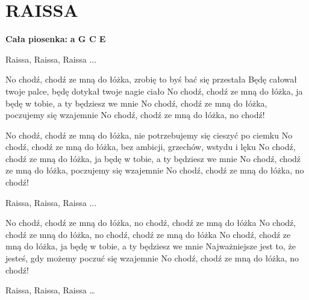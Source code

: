 \documentclass[../../../songbook.tex]{subfiles}
\begin{document}
\TabPositions{8cm} %
\section*{RAISSA}
{}
\vspace{0.5cm}
\textbf{Cała piosenka:} {\color{red}\textbf{a G C E} } \newline

	Raissa, Raissa, Raissa ...		 \newline

No chodź, chodź ze mną do łóżka, zrobię to byś bać się przestała		 \newline
Będę całował twoje palce, będę dotykał twoje nagie ciało			 \newline
No chodź, chodź ze mną do łóżka, ja będę w tobie, a ty będziesz we mnie		 \newline
No chodź, chodź ze mną do łóżka, poczujemy się wzajemnie		 \newline
No chodź, chodź ze mną do łóżka, no chodź!		 \newline

No chodź, chodź ze mną do łóżka, nie potrzebujemy się cieszyć po ciemku		 \newline
No chodź, chodź ze mną do łóżka, bez ambicji, grzechów, wstydu i lęku		 \newline
No chodź, chodź ze mną do łóżka, ja będę w tobie, a ty będziesz we mnie		 \newline
No chodź, chodź ze mną do łóżka, poczujemy się wzajemnie		 \newline
No chodź, chodź ze mną do łóżka, no chodź!		 \newline

\-\hspace{1cm} Raissa, Raissa, Raissa ...			 \newline

No chodź, chodź ze mną do łóżka, no chodź, chodź ze mną do łóżka		 \newline
No chodź, chodź ze mną do łóżka, no chodź, chodź ze mną do łóżka		 \newline
No chodź, chodź ze mną do łóżka, ja będę w tobie, a ty będziesz we mnie		 \newline
Najważniejsze jest to, że jesteś, gdy możemy poczuć się wzajemnie		 \newline
No chodź, chodź ze mną do łóżka, no chodź!		 \newline

\-\hspace{1cm} Raissa, Raissa, Raissa …
\end{document}
